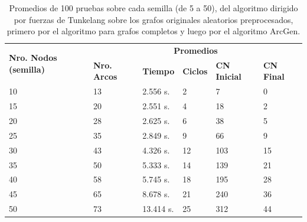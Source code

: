 



\begin{table}
	\caption{Promedios de 100 pruebas sobre cada semilla (de 5 a 50), del algoritmo dirigido por fuerzas de Tunkelang sobre los grafos originales aleatorios preprocesados, primero por el algoritmo para grafos completos y luego por el algoritmo ArcGen.}
	\label{tab:resultados_orig_alg_com_gen_fue}
	\begin{tabularx}{\linewidth}{|p{1.5cm}|p{1.2cm}|p{1.5cm}|p{1.5cm}|X|X|}
		\hline
		\multirow{2}{2cm}{\textbf{Nro. Nodos (semilla)}} & \multicolumn{5}{c|}{\textbf{Promedios}} \\
		\cline{2-6} & \textbf{Nro. Arcos} & \textbf{Tiempo} & \textbf{Ciclos} & \textbf{CN Inicial} & \textbf{CN Final} \\
		\hline
		10 & 13 & 2.556 s. & 2 & 7 & 0 \\
		\hline
		15 & 20 & 2.551 s. & 4 & 18 & 2 \\
		\hline
		20 & 28 & 2.625 s. & 6 & 38 & 5 \\
		\hline
		25 & 35 & 2.849 s. & 9 & 66 & 9 \\
		\hline
		30 & 43 & 4.326 s. & 12 & 103 & 15 \\
		\hline
		35 & 50 & 5.333 s. & 14 & 139 & 21 \\
		\hline
		40 & 58 & 5.745 s. & 18 & 195 & 28 \\
		\hline
		45 & 65 & 8.678 s. & 21 & 240 & 36 \\
		\hline
		50 & 73 & 13.414 s. & 25 & 312 & 44 \\
		\hline
	\end{tabularx}
\end{table}

